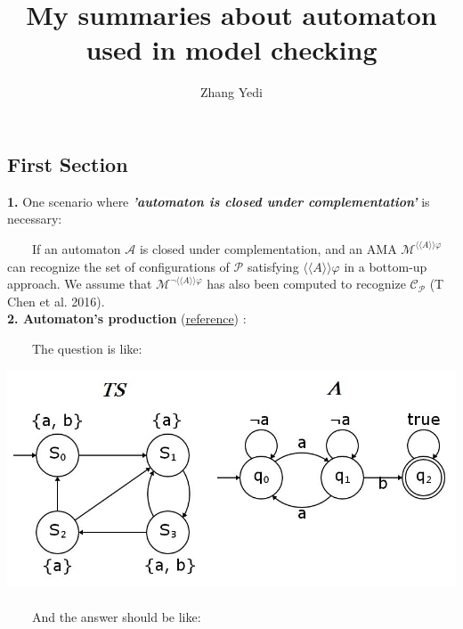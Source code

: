 \documentclass{sciposter}
\title{\huge{My summaries about automaton used in model checking}}
\author{\large{Zhang Yedi}}
\begin{document}
\selectfont

\maketitle



\begin{multicols}{3}
\section{First Section}	
    \textbf{1. }One scenario where \textbf{\emph{'automaton is closed under complementation'}} is necessary:

    ~~~~If an automaton $\mathcal{A}$ is closed under complementation, and an AMA $\mathcal{M}^{\langle\langle A\rangle\rangle\varphi}$ can recognize the set of configurations of $\mathcal{P}$ satisfying $\langle\langle A \rangle\rangle\varphi$ in a bottom-up approach. We assume that $\mathcal{M}^{\neg\langle\langle A \rangle\rangle\varphi }$ has also been computed to recognize $\mathcal{C}_{\mathcal{P}}$ (T Chen et al. 2016).
    \\

    \textbf{2. Automaton's production} (\href{https://cs.stackexchange.com/questions/41268/product-of-a-transition-system-and-a-finite-automaton}{reference})
    :

    ~~~~The question is like:

    \includegraphics{figures/1-1-question.jpg}~\\[1cm]

    ~~~~And the answer should be like:


\end{multicols}
\end{document}
